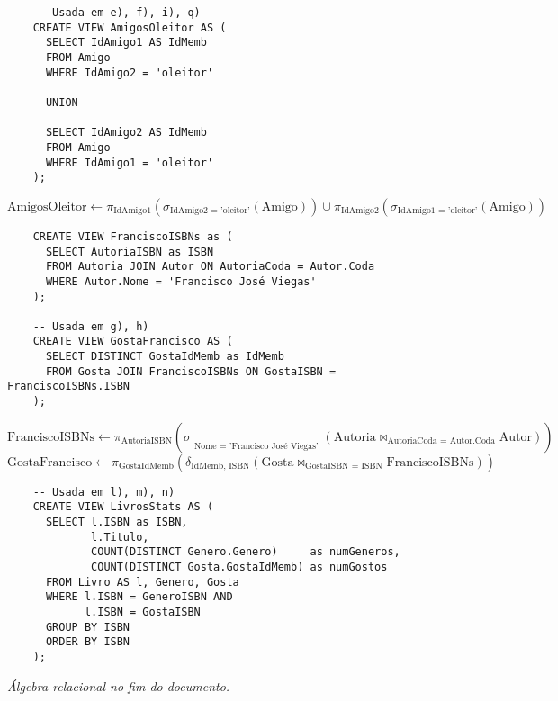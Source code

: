 \documentclass {report}
\begin{document}
\begin{lstlisting}   
    -- Usada em e), f), i), q) 
    CREATE VIEW AmigosOleitor AS (
      SELECT IdAmigo1 AS IdMemb
      FROM Amigo 
      WHERE IdAmigo2 = 'oleitor'
       
      UNION
       
      SELECT IdAmigo2 AS IdMemb
      FROM Amigo 
      WHERE IdAmigo1 = 'oleitor'
    );
\end{lstlisting}
\[
\text{AmigosOleitor} \leftarrow \pi_{\text{IdAmigo1}}(\sigma_{\text{IdAmigo2 = 'oleitor'}}(\text{Amigo})) \cup \pi_{\text{IdAmigo2}}(\sigma_{\text{IdAmigo1 = 'oleitor'}}(\text{Amigo}))
\]
\vspace{0.5cm}


    
\begin{lstlisting}    
    CREATE VIEW FranciscoISBNs as (
      SELECT AutoriaISBN as ISBN
      FROM Autoria JOIN Autor ON AutoriaCoda = Autor.Coda
      WHERE Autor.Nome = 'Francisco José Viegas'
    );

    -- Usada em g), h)
    CREATE VIEW GostaFrancisco AS (
      SELECT DISTINCT GostaIdMemb as IdMemb
      FROM Gosta JOIN FranciscoISBNs ON GostaISBN = FranciscoISBNs.ISBN
    );
\end{lstlisting}
\[
\text{FranciscoISBNs} \leftarrow \pi_{\text{AutoriaISBN}}\left(\sigma_{\substack{ \\ \text{Nome = 'Francisco José Viegas'}}}(\text{Autoria} \bowtie_{\text{AutoriaCoda = Autor.Coda}} \text{Autor})\right)
\]
\[
\text{GostaFrancisco} \leftarrow \pi_{\text{GostaIdMemb}}(\delta_{\text{IdMemb, ISBN}}(\text{Gosta} \bowtie_{\text{GostaISBN = ISBN}} \text{FranciscoISBNs}))
\]
\vspace{0.5cm}


\begin{lstlisting}    
    -- Usada em l), m), n)
    CREATE VIEW LivrosStats AS (
      SELECT l.ISBN as ISBN,
             l.Titulo,
             COUNT(DISTINCT Genero.Genero)     as numGeneros,
             COUNT(DISTINCT Gosta.GostaIdMemb) as numGostos
      FROM Livro AS l, Genero, Gosta
      WHERE l.ISBN = GeneroISBN AND
            l.ISBN = GostaISBN
      GROUP BY ISBN
      ORDER BY ISBN
    );
\end{lstlisting}
\textit{Álgebra relacional no fim do documento.}


\vspace{0.5cm}
\end{document}
